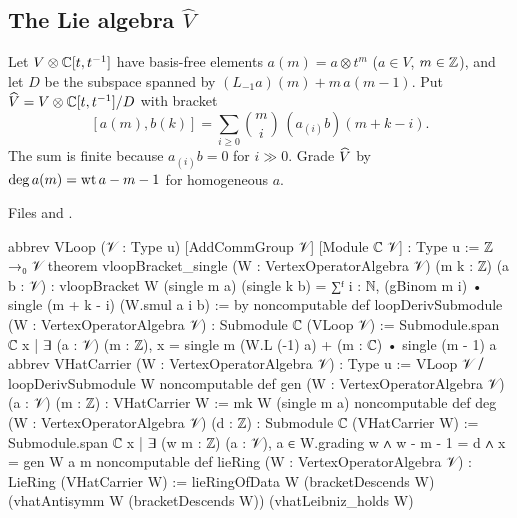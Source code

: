 \subsection{The Lie algebra \texorpdfstring{$\widehat V$}{V-hat}}

\begin{definition}\label{l13:def:vhat}
Let $V\otimes{\mathbb{C}}[t,t^{-1}]$ have basis-free elements $a(m) = a\otimes t^m$ ($a\in V$, $m\in{\mathbb{Z}}$), and let $D$ be the subspace
spanned by $(L_{-1}a)(m) + m\,a(m-1)$. Put $\widehat{V} = V\otimes{\mathbb{C}}[t,t^{-1}]/D$ with bracket
\begin{equation}\label{l13:eq:bracket}
 [a(m),b(k)] = \sum_{i\ge0}\binom mi\,(a_{(i)}b)(m+k-i).
\end{equation}
The sum is finite because $a_{(i)}b = 0$ for $i\gg0$. Grade $\widehat{V}$ by $\deg a(m) = \operatorname{wt} a - m - 1$ for homogeneous
$a$.
\end{definition}
\noindent Files  and
.
\begin{leancode}
abbrev VLoop (𝒱 : Type u) [AddCommGroup 𝒱] [Module ℂ 𝒱] : Type u := ℤ →₀ 𝒱
theorem vloopBracket_single (W : VertexOperatorAlgebra 𝒱) (m k : ℤ) (a b : 𝒱) :
    vloopBracket W (single m a) (single k b)
      = ∑ᶠ i : ℕ, (gBinom m i) • single (m + k - i) (W.smul a i b) := by
noncomputable def loopDerivSubmodule (W : VertexOperatorAlgebra 𝒱) : Submodule ℂ (VLoop 𝒱) :=
  Submodule.span ℂ {x | ∃ (a : 𝒱) (m : ℤ),
    x = single m (W.L (-1) a) + (m : ℂ) • single (m - 1) a}
abbrev VHatCarrier (W : VertexOperatorAlgebra 𝒱) : Type u := VLoop 𝒱 ⧸ loopDerivSubmodule W
noncomputable def gen (W : VertexOperatorAlgebra 𝒱) (a : 𝒱) (m : ℤ) : VHatCarrier W :=
  mk W (single m a)
noncomputable def deg (W : VertexOperatorAlgebra 𝒱) (d : ℤ) : Submodule ℂ (VHatCarrier W) :=
  Submodule.span ℂ {x | ∃ (w m : ℤ) (a : 𝒱), a ∈ W.grading w ∧ w - m - 1 = d ∧ x = gen W a m}
noncomputable def lieRing (W : VertexOperatorAlgebra 𝒱) : LieRing (VHatCarrier W) :=
  lieRingOfData W (bracketDescends W)
    (vhatAntisymm W (bracketDescends W)) (vhatLeibniz_holds W)
\end{leancode}

